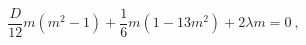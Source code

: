 \begin{equation}
\frac{D}{12} m (m^{2} - 1)+ \frac{1}{6} m (1 - 13 m^{2}) + 2
\lambda m = 0~,
\end{equation}

